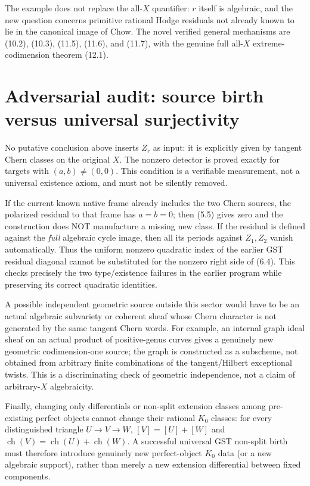 \documentclass[11pt]{article}
\newcommand{\ch}{\operatorname{ch}}
\begin{document}
The example does not replace the all-\(X\) quantifier:
\(r\) itself is algebraic, and the new question concerns
primitive rational Hodge residuals not already known to lie
in the canonical image of Chow.
The novel verified general mechanisms are (10.2), (10.3),
(11.5), (11.6), and (11.7), with the genuine full all-\(X\)
extreme-codimension theorem (12.1).

\section{Adversarial audit: source birth versus universal surjectivity}
No putative conclusion above inserts \(Z_r\) as input: it is
explicitly given by tangent Chern classes on the original \(X\).
The nonzero detector is proved exactly for targets with
\((a,b)\ne(0,0)\). This condition is a verifiable measurement,
not a universal existence axiom, and must not be silently removed.

If the current known native frame already includes the two Chern
sources, the polarized residual to that frame has \(a=b=0\);
then (5.5) gives zero and the construction does NOT manufacture
a missing new class. If the residual is defined against the
\emph{full} algebraic cycle image, then all its periods against
\(Z_1,Z_2\) vanish automatically. Thus the uniform nonzero
quadratic index of the earlier GST residual diagonal cannot
be substituted for the nonzero right side of (6.4).
This checks precisely the two type/existence failures in the
earlier program while preserving its correct quadratic identities.

A possible independent geometric source outside this sector
would have to be an actual algebraic subvariety or coherent sheaf
whose Chern character is not generated by the same tangent
Chern words. For example, an internal graph ideal sheaf on an
actual product of positive-genus curves gives a genuinely new
geometric codimension-one source; the graph is constructed as
a subscheme, not obtained from arbitrary finite combinations
of the tangent/Hilbert exceptional twists. This is a
discriminating check of geometric independence, not a
claim of arbitrary-\(X\) algebraicity.

Finally, changing only differentials or non-split extension
classes among pre-existing perfect objects cannot change their
rational \(K_0\) classes:
for every distinguished triangle \(U\to V\to W\),
\([V]=[U]+[W]\) and \(\ch(V)=\ch(U)+\ch(W)\).
A successful universal GST non-split birth must therefore
introduce genuinely new perfect-object \(K_0\) data (or a new
algebraic support), rather than merely a new extension
differential between fixed components.
\end{document}
